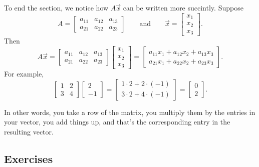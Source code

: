 To end the section, we notice how $A \vec{x}$ can be written more succintly.
Suppose
\begin{equation*}
A = 
\begin{bmatrix}
a_{11} & a_{12} & a_{13} \\
a_{21} & a_{22} & a_{23}
\end{bmatrix}
\qquad \text{and} \qquad
\vec{x} = 
\begin{bmatrix}
x_1 \\ x_2 \\ x_3 
\end{bmatrix} .
\end{equation*}
Then
\begin{equation*}
A \vec{x} = 
\begin{bmatrix}
a_{11} & a_{12} & a_{13} \\
a_{21} & a_{22} & a_{23}
\end{bmatrix}
\begin{bmatrix}
x_1 \\ x_2 \\ x_3 
\end{bmatrix} 
=
\begin{bmatrix}
a_{11} x_1 + a_{12} x_2 + a_{13} x_3 \\
a_{21} x_1 + a_{22} x_2 + a_{23} x_3
\end{bmatrix}  .
\end{equation*}
For example,
\begin{equation*}
\begin{bmatrix}
1 & 2 \\ 3 & 4
\end{bmatrix}
\begin{bmatrix}
2 \\ -1
\end{bmatrix} 
=
\begin{bmatrix}
1 \cdot 2 + 2 \cdot (-1) \\
3 \cdot 2 + 4 \cdot (-1)
\end{bmatrix}
=
\begin{bmatrix}
0 \\ 2
\end{bmatrix}  .
\end{equation*}

In other words, you take a row of the matrix, you multiply them by the
entries in your vector, you add things up, and that's the corresponding
entry in the resulting vector.

\subsection{Exercises}

